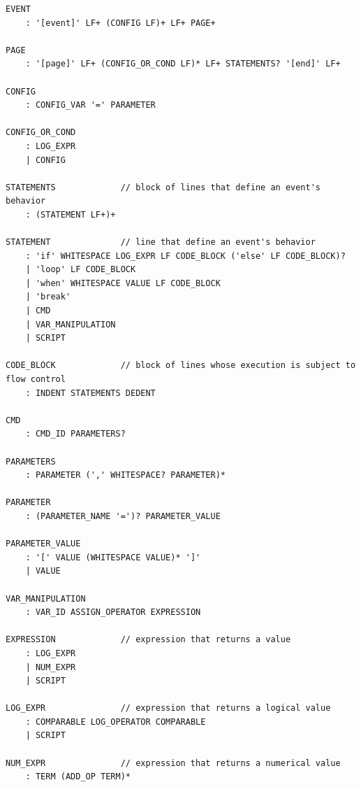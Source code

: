 \documentclass[11pt]{article}
\begin{document}
\begin{Verbatim}[frame=single, fontsize=\footnotesize]
EVENT
    : '[event]' LF+ (CONFIG LF)+ LF+ PAGE+

PAGE
    : '[page]' LF+ (CONFIG_OR_COND LF)* LF+ STATEMENTS? '[end]' LF+
    
CONFIG
    : CONFIG_VAR '=' PARAMETER
    
CONFIG_OR_COND
    : LOG_EXPR
    | CONFIG
    
STATEMENTS             // block of lines that define an event's behavior
    : (STATEMENT LF+)+
    
STATEMENT              // line that define an event's behavior
    : 'if' WHITESPACE LOG_EXPR LF CODE_BLOCK ('else' LF CODE_BLOCK)?
    | 'loop' LF CODE_BLOCK
    | 'when' WHITESPACE VALUE LF CODE_BLOCK
    | 'break'
    | CMD
    | VAR_MANIPULATION
    | SCRIPT
    
CODE_BLOCK             // block of lines whose execution is subject to flow control
    : INDENT STATEMENTS DEDENT
    
CMD
    : CMD_ID PARAMETERS?
    
PARAMETERS
    : PARAMETER (',' WHITESPACE? PARAMETER)*
    
PARAMETER
    : (PARAMETER_NAME '=')? PARAMETER_VALUE
    
PARAMETER_VALUE
    : '[' VALUE (WHITESPACE VALUE)* ']'
    | VALUE
    
VAR_MANIPULATION
    : VAR_ID ASSIGN_OPERATOR EXPRESSION
    
EXPRESSION             // expression that returns a value
    : LOG_EXPR
    | NUM_EXPR
    | SCRIPT
    
LOG_EXPR               // expression that returns a logical value
    : COMPARABLE LOG_OPERATOR COMPARABLE
    | SCRIPT
    
NUM_EXPR               // expression that returns a numerical value
    : TERM (ADD_OP TERM)*
\end{Verbatim}
\end{document}
